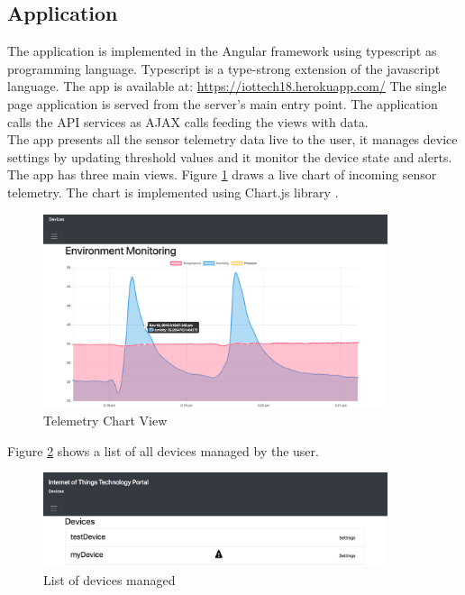 \subsection{Application}
The application is implemented in the Angular framework using typescript as programming language. Typescript is a type-strong extension of the javascript language. The app is available at: \href{https://iottech18.herokuapp.com/}{https://iottech18.herokuapp.com/} The single page application is served from the server's main entry point. The application calls the API services as AJAX calls feeding the views with data. \\

The app presents all the sensor telemetry data live to the user, it manages device settings by updating threshold values and it monitor the device state and alerts. The app has three main views.
Figure \ref{fig:chartview} draws a live chart of incoming sensor telemetry. The chart is implemented using Chart.js library \cite{chart}.

\begin{figure}[H]
    \centering
    \includegraphics[width=0.9\textwidth]{figures/App/app_dashboard}
    \caption{Telemetry Chart View}
    \label{fig:chartview}
\end{figure}

Figure \ref{fig:devicelist} shows a list of all devices managed by the user. 

\begin{figure}[H]
    \centering
    \includegraphics[width=0.9\textwidth]{figures/App/app_device_list}
    \caption{List of devices managed}
    \label{fig:devicelist}
\end{figure}

